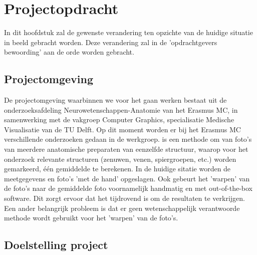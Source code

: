 \section{Projectopdracht}
\label{projectopdracht}


In dit hoofdstuk zal de gewenste verandering ten opzichte van de huidige situatie in beeld gebracht worden. 
Deze verandering zal in de 'opdrachtgevers bewoording' aan de orde worden gebracht. 


\subsection{Projectomgeving}

De projectomgeving waarbinnen we voor het \casamproject gaan werken bestaat uit de onderzoeksafdeling Neurowetenschappen-Anatomie van het Erasmus MC, in samenwerking met de vakgroep Computer Graphics, specialisatie Medische Visualisatie van de TU Delft. 
Op dit moment worden er bij het Erasmus MC verschillende onderzoeken gedaan in de \casam werkgroep. 
\casam is een methode om van foto's van meerdere anatomische preparaten van eenzelfde structuur, waarop voor het onderzoek relevante structuren (zenuwen, venen, spiergroepen, etc.) worden gemarkeerd, \'e\'en gemiddelde te berekenen. 
In de huidige sitatie worden de meetgegevens en foto's 'met de hand' opgeslagen. 
Ook gebeurt het 'warpen' van de foto's naar de gemiddelde foto voornamelijk handmatig en met out-of-the-box software. 
Dit zorgt ervoor dat het tijdrovend is om de resultaten te verkrijgen. 
Een ander belangrijk probleem is dat er geen wetenschappelijk verantwoorde methode wordt gebruikt voor het 'warpen' van de foto's.


\subsection{Doelstelling project}

